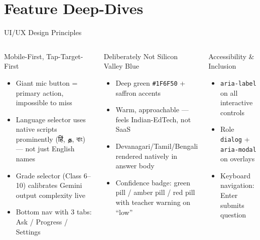 \documentclass[aspectratio=169, 12pt]{beamer}
\begin{document}
\section{Feature Deep-Dives}

\begin{frame}{UI/UX Design Principles}
  \begin{columns}[T]
      \begin{block}{Mobile-First, Tap-Target-First}
        \begin{itemize}\small
          \item Giant mic button = primary action, impossible to miss
          \item Language selector uses native scripts prominently
                (हिं, த, বাং) — not just English names
          \item Grade selector (Class 6--10) calibrates Gemini
                output complexity live
          \item Bottom nav with 3 tabs: Ask / Progress / Settings
        \end{itemize}
      \end{block}
      \vspace{6pt}
      \begin{block}{Deliberately Not Silicon Valley Blue}
        \begin{itemize}\small
          \item Deep green \texttt{\#1F6F50} + saffron accents
          \item Warm, approachable --- feels Indian-EdTech, not SaaS
          \item Devanagari/Tamil/Bengali rendered natively in answer body
          \item Confidence badge: green pill / amber pill / red pill
                with teacher warning on ``low''
        \end{itemize}
      \end{block}
      \begin{block}{Accessibility \& Inclusion}
        \begin{itemize}\small
          \item \texttt{aria-label} on all interactive controls
          \item Role \texttt{dialog} + \texttt{aria-modal} on overlays
          \item Keyboard navigation: Enter submits question

\end{itemize}
\end{block}
\end{columns}
\end{frame}
\end{document}
